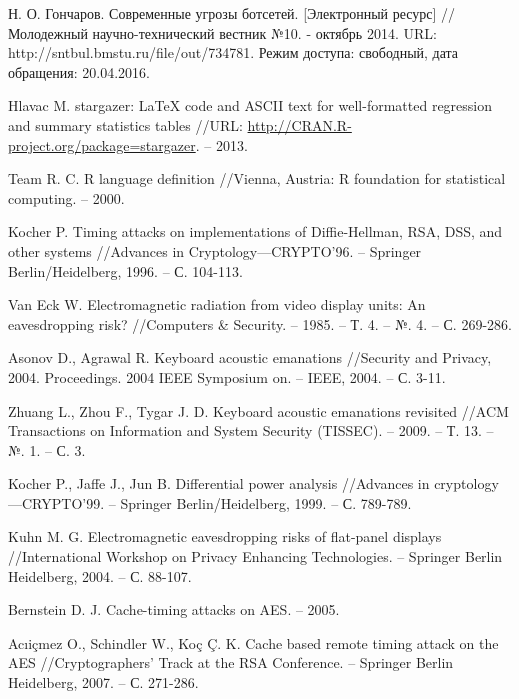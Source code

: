 \begingroup
\renewcommand{\section}[2]{\anonsection{Библиографический список}}
\begin{thebibliography}{00}

    Н. О. Гончаров.
    Современные угрозы ботсетей. [Электронный ресурс] // Молодежный научно-технический вестник №10. - октябрь 2014.
    URL: http://sntbul.bmstu.ru/file/out/734781.
    Режим доступа: свободный, дата обращения: 20.04.2016.

  Hlavac M. stargazer: LaTeX code and ASCII text for well-formatted regression and summary statistics tables //URL: \url{http://CRAN.R-project.org/package=stargazer}. – 2013.

  Team R. C. R language definition //Vienna, Austria: R foundation for statistical computing. – 2000.

  Kocher P. Timing attacks on implementations of Diffie-Hellman, RSA, DSS, and other systems //Advances in Cryptology—CRYPTO’96. – Springer Berlin/Heidelberg, 1996. – С. 104-113.

  Van Eck W. Electromagnetic radiation from video display units: An eavesdropping risk? //Computers \& Security. – 1985. – Т. 4. – №. 4. – С. 269-286.

  Asonov D., Agrawal R. Keyboard acoustic emanations //Security and Privacy, 2004. Proceedings. 2004 IEEE Symposium on. – IEEE, 2004. – С. 3-11.

  Zhuang L., Zhou F., Tygar J. D. Keyboard acoustic emanations revisited //ACM Transactions on Information and System Security (TISSEC). – 2009. – Т. 13. – №. 1. – С. 3.

  Kocher P., Jaffe J., Jun B. Differential power analysis //Advances in cryptology—CRYPTO’99. – Springer Berlin/Heidelberg, 1999. – С. 789-789.

  Kuhn M. G. Electromagnetic eavesdropping risks of flat-panel displays //International Workshop on Privacy Enhancing Technologies. – Springer Berlin Heidelberg, 2004. – С. 88-107.

  Bernstein D. J. Cache-timing attacks on AES. – 2005.

  Acıiçmez O., Schindler W., Koç Ç. K. Cache based remote timing attack on the AES //Cryptographers’ Track at the RSA Conference. – Springer Berlin Heidelberg, 2007. – С. 271-286.


\end{thebibliography}
